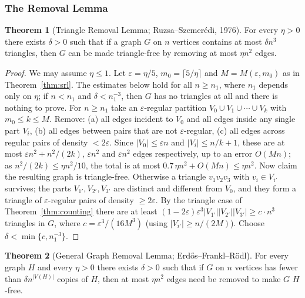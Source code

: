 \documentclass{article}
\theoremstyle{definition}
\newtheorem{theorem}{Theorem}
\begin{document}
\subsubsection{The Removal Lemma}

\begin{theorem}[Triangle Removal Lemma; Ruzsa--Szemer\'edi, 1976]\label{thm:triangleremoval}
For every $\eta > 0$ there exists $\delta > 0$ such that if a graph
$G$ on $n$ vertices contains at most $\delta n^3$ triangles, then
$G$ can be made triangle-free by removing at most $\eta n^2$ edges.
\end{theorem}

\begin{proof}
We may assume $\eta \le 1$. Let $\varepsilon = \eta/5$, $m_0 = \lceil 5/\eta \rceil$
and $M = M(\varepsilon, m_0)$ as in Theorem~\ref{thm:srl}. The estimates below
hold for all $n \ge n_1$, where $n_1$ depends only on $\eta$; if $n < n_1$ and
$\delta < n_1^{-3}$, then $G$ has no triangles at all and there is nothing to
prove. For
$n \ge n_1$ take an $\varepsilon$-regular partition
$V_0 \cup V_1 \cup \cdots \cup V_k$ with $m_0 \le k \le M$. Remove: (a) all
edges incident to $V_0$ and all edges inside any single part $V_i$, (b) all
edges between pairs that are not $\varepsilon$-regular, (c) all edges across
regular pairs of density $< 2\varepsilon$. Since $|V_0| \le \varepsilon n$ and
$|V_i| \le n/k + 1$, these are at most $\varepsilon n^2 + n^2/(2k)$,
$\varepsilon n^2$ and $\varepsilon n^2$ edges respectively, up to an error
$O(Mn)$; as $n^2/(2k) \le \eta n^2/10$, the total is at most
$0.7\,\eta n^2 + O(Mn) \le \eta n^2$. Now claim the resulting graph is
triangle-free. Otherwise a triangle $v_1 v_2 v_3$ with
$v_i \in V_{i'}$ survives; the parts $V_{1'}, V_{2'}, V_{3'}$ are distinct
and different from $V_0$, and they form a triangle of $\varepsilon$-regular
pairs of density $\ge 2\varepsilon$. By the triangle case of
Theorem~\ref{thm:counting} there are at least
$(1 - 2\varepsilon)\varepsilon^3 |V_{1'}||V_{2'}||V_{3'}| \ge c \cdot n^3$
triangles in $G$, where $c = \varepsilon^3/(16 M^3)$ (using
$|V_{i'}| \ge n/(2M)$). Choose $\delta < \min\{c, n_1^{-3}\}$.
\end{proof}

\begin{theorem}[General Graph Removal Lemma; Erd\H{o}s--Frankl--R\"odl]
For every graph $H$ and every $\eta > 0$ there exists $\delta > 0$
such that if $G$ on $n$ vertices has fewer than $\delta n^{|V(H)|}$
copies of $H$, then at most $\eta n^2$ edges need be removed to make
$G$ $H$-free.
\end{theorem}
\end{document}
